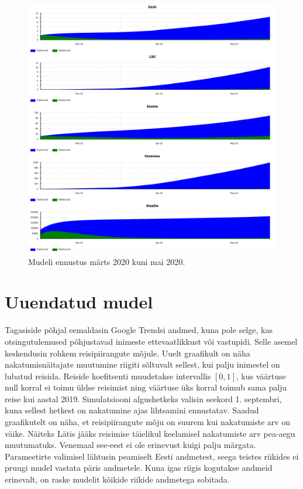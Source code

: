 \documentclass[a4paper]{article}
\begin{document}
  \begin{figure}
    \centering
    \includegraphics[width=\textwidth]{graphics/twomonths.png}
    \caption{Mudeli ennustus märts 2020 kuni mai 2020.}
  \end{figure}

  \section{Uuendatud mudel}
  Tagasiside põhjal eemaldasin Google Trendsi andmed, kuna pole selge, kas otsingutulemused
  põhjustavad inimeste ettevaatlikkust või vastupidi. Selle asemel keskendusin rohkem
  reisipiirangute mõjule. Uuelt graafikult on näha nakatumisnäitajate muutumine
  riigiti sõltuvalt sellest, kui palju inimestel on lubatud reisida. Reiside koefitsenti
  muudetakse intervallis $[0,1]$, kus väärtuse null korral ei toimu üldse reisimist
  ning väärtuse üks korral toimub sama palju reise kui aastal 2019. Simulatsiooni 
  algushetkeks valisin seekord 1. septembri, kuna sellest hetkest on nakatumine ajas
  lihtsamini ennustatav. Saadud graafikutelt on näha, et reisipiirangute mõju on
  suurem kui nakatumiste arv on väike. Näiteks Lätis jääks reisimise täielikul
  keelamisel nakatumiste arv pea-aegu muutumatuks. Venemaal see-eest ei ole erinevust kuigi palju märgata. Parameetirte valimisel lähtusin 
  peamiselt Eesti andmetest, seega teistes riikides ei pruugi mudel vastata päris 
  andmetele. Kuna igas riigis kogutakse andmeid erinevalt, on raske mudelit kõikide riikide andmetega sobitada.
\end{document}
